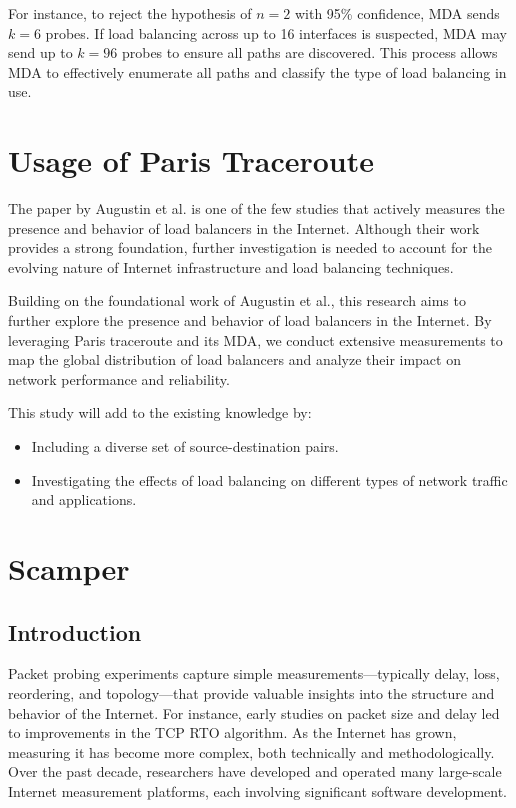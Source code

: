 \documentclass[12pt]{cwru_thesis}
\begin{document}
For instance, to reject the hypothesis of \(n = 2\) with 95\% confidence, MDA sends \(k = 6\) probes. If load balancing across up to 16 interfaces is suspected, MDA may send up to \(k = 96\) probes to ensure all paths are discovered. This process allows MDA to effectively enumerate all paths and classify the type of load balancing in use.

\section{Usage of Paris Traceroute}

The paper by Augustin et al. \cite{Augustin2007} is one of the few studies that actively measures the presence and behavior of load balancers in the Internet. Although their work provides a strong foundation, further investigation is needed to account for the evolving nature of Internet infrastructure and load balancing techniques.

Building on the foundational work of Augustin et al., this research aims to further explore the presence and behavior of load balancers in the Internet. By leveraging Paris traceroute and its MDA, we conduct extensive measurements to map the global distribution of load balancers and analyze their impact on network performance and reliability.

This study will add to the existing knowledge by:
\begin{itemize}
    \item Including a diverse set of source-destination pairs.
    \item Investigating the effects of load balancing on different types of network traffic and applications.
\end{itemize}

\section{Scamper}

\subsection{Introduction}

Packet probing experiments capture simple measurements—typically delay, loss, reordering, and topology—that provide valuable insights into the structure and behavior of the Internet. For instance, early studies on packet size and delay led to improvements in the TCP RTO algorithm. As the Internet has grown, measuring it has become more complex, both technically and methodologically. Over the past decade, researchers have developed and operated many large-scale Internet measurement platforms, each involving significant software development.
\end{document}
